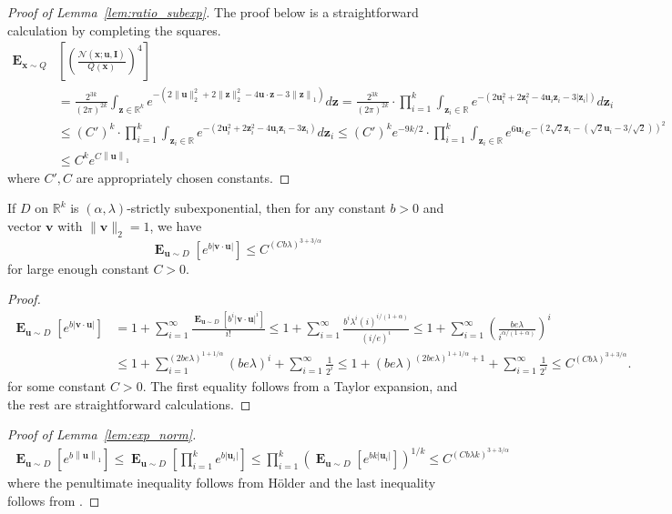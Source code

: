 \documentclass{theoretics}
\newcommand\twonorm[1]{\|#1\|_2}
\newcommand\norm[1]{\left\| #1 \right\|}
\renewcommand\vec[1]{\mathbf{#1}}
\DeclareMathOperator*{\E}{\mathbf{E}}
\newcommand{\R}{\mathbb{R}}
\newcommand{\1}{\Ind}
\newcommand{\x}{\vec x}
\renewcommand{\vv}{\vec v}
\newcommand{\vu}{\vec u}
\newcommand{\z}{\vec z}
\begin{document}
\begin{proof}[Proof of Lemma~\ref{lem:ratio_subexp}]
\label{proof:ratio_subexp}
The proof below is a straightforward calculation by completing the squares.
    \begin{align*}
        \E_{\x\sim Q}&\left[\left(\frac{\mathcal{N}(\x; \vu, \vec I)}{
             Q(\x)}\right)^4\right] \\&=\frac{2^{3k}}{{(2\pi)}^{2k}}\int_{\z\in \R^k}e^{-(2\twonorm{\vu}^2+2\twonorm{\z}^2-4\vu\cdot \z-3\norm{\z}_1)} d\z
            =\frac{2^{3k}}{(2\pi)^{2k}}\cdot\prod_{i=1}^{k}\int_{\z_i\in \R}e^{-(2\vu_i^2+2\z_i^2-4\vu_i\z_i-3|\z_i|)} d\z_i\\
            &\leq (C')^{k}\cdot \prod_{i=1}^{k}\int_{\z_i\in \R}e^{-(2\vu_i^2+2\z_i^2-4\vu_i\z_i-3\z_i)} d\z_i
            \leq (C')^ke^{-9k/2}\cdot \prod_{i=1}^{k}\int_{\z_i\in \R} e^{6\vu_i}e^{-(2\sqrt{2}\z_i-(\sqrt{2}{\vu_i}-3/\sqrt{2}))^2}\\
            &\leq C^ke^{C\norm{\vu}_1}
    \end{align*}
    where $C',C$ are appropriately chosen constants. 
\end{proof} 
\begin{lemma}
    \label{lem:exp_ip}
    If $D$ on $\R^k$ is $(\alpha,\lambda)$-strictly subexponential, then for any constant $b>0$ and vector $\vv$ with $\twonorm{\vv}=1$, we have 
    \[
      \E_{\vu\sim D}\left[e^{b|\vv\cdot \vu|  }\right]\leq C^{(Cb\lambda)^{3+3/\alpha}}
    \] for large enough constant $C>0$.
\end{lemma}
\begin{proof}
    \begin{align*}
        \E_{\vu\sim D}\left[e^{b|\vv\cdot \vu|  }\right]&=1+\sum_{i=1}^{\infty}\frac{\E_{\vu\sim D}\left[b^i|\vv\cdot \vu|^i\right]}{i!}
        \leq 1+\sum_{i=1}^{\infty}\frac{b^i\lambda^i (i)^{i/(1+\alpha)}}{(i/e)^i}
        \leq 1+\sum_{i=1}^{\infty}\left(\frac{be\lambda}{i^{\alpha/(1+\alpha)}}\right)^i\\
        &\leq 1+\sum_{i=1}^{(2be\lambda)^{1+1/\alpha}}(be\lambda)^i+\sum_{i=1}^{\infty}\frac{1}{2^i}\leq  1+(be\lambda)^{(2be\lambda)^{1+1/\alpha}+1}+\sum_{i=1}^{\infty}\frac{1}{2^i}
        \leq  C^{(Cb\lambda)^{3+3/\alpha}}.
    \end{align*} for some constant $C>0$. The first equality follows from a Taylor expansion, and the rest are straightforward calculations.
\end{proof}

\begin{proof}[Proof of Lemma~\ref{lem:exp_norm}]
\label{proof:exp_norm}
    \begin{align*}
        \E_{\vu\sim D}\left[e^{b\norm{\vu}_1}\right ] \leq \E_{\vu\sim D}\left[\prod_{i=1}^{k}e^{b|\vu_i|}\right]
        \leq \prod_{i=1}^{k}\left(\E_{\vu\sim D}\left[e^{bk|\vu_i|}\right]\right)^{1/k}
        \leq C^{\left(Cb\lambda k\right)^{3+3/\alpha}}
    \end{align*}
    where the penultimate inequality follows from H{\"o}lder and the last inequality follows from .
\end{proof}
\end{document}
